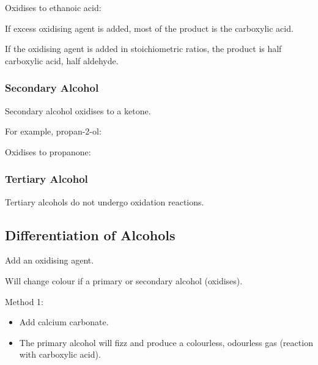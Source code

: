 \documentclass[a4paper,11pt]{article}
\begin{document}
Oxidises to ethanoic acid:

\begin{center}
\end{center}

If excess oxidising agent is added, most of the product is the carboxylic acid.

If the oxidising agent is added in stoichiometric ratios, the product is half
carboxylic acid, half aldehyde.


\subsubsection{Secondary Alcohol}

Secondary alcohol oxidises to a ketone.

For example, propan-2-ol:

\begin{center}
\end{center}

Oxidises to propanone:

\begin{center}
\end{center}


\subsubsection{Tertiary Alcohol}

Tertiary alcohols do not undergo oxidation reactions.


\subsection{Differentiation of Alcohols}

Add an oxidising agent.

Will change colour if a primary or secondary alcohol (oxidises).

Method 1:

\begin{itemize}
\item Add calcium carbonate.
\item The primary alcohol will fizz and produce a colourless, odourless gas
	(reaction with carboxylic acid).
\end{itemize}
\end{document}
